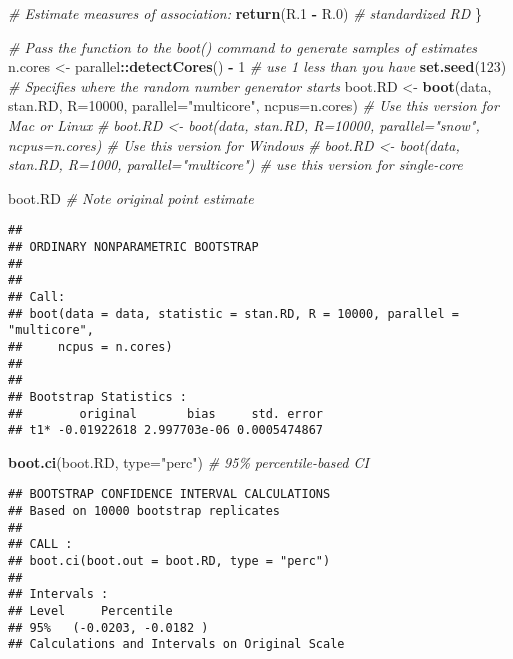 \documentclass[
]{article}
\newenvironment{Shaded}{\begin{snugshade}}{\end{snugshade}}
\newcommand{\AttributeTok}[1]{\textcolor[rgb]{0.13,0.29,0.53}{#1}}
\newcommand{\CommentTok}[1]{\textcolor[rgb]{0.56,0.35,0.01}{\textit{#1}}}
\newcommand{\DecValTok}[1]{\textcolor[rgb]{0.00,0.00,0.81}{#1}}
\newcommand{\FloatTok}[1]{\textcolor[rgb]{0.00,0.00,0.81}{#1}}
\newcommand{\FunctionTok}[1]{\textcolor[rgb]{0.13,0.29,0.53}{\textbf{#1}}}
\newcommand{\NormalTok}[1]{#1}
\newcommand{\OtherTok}[1]{\textcolor[rgb]{0.56,0.35,0.01}{#1}}
\newcommand{\SpecialCharTok}[1]{\textcolor[rgb]{0.81,0.36,0.00}{\textbf{#1}}}
\newcommand{\StringTok}[1]{\textcolor[rgb]{0.31,0.60,0.02}{#1}}
\begin{document}
\begin{Shaded}
\begin{Highlighting}[]
  \CommentTok{\# Estimate measures of association:}
  \FunctionTok{return}\NormalTok{(R}\FloatTok{.1} \SpecialCharTok{{-}}\NormalTok{ R}\FloatTok{.0}\NormalTok{) }\CommentTok{\# standardized RD}
\NormalTok{\}}

\CommentTok{\# Pass the function to the boot() command to generate samples of estimates}
\NormalTok{n.cores }\OtherTok{\textless{}{-}}\NormalTok{ parallel}\SpecialCharTok{::}\FunctionTok{detectCores}\NormalTok{() }\SpecialCharTok{{-}} \DecValTok{1} \CommentTok{\# use 1 less than you have}
\FunctionTok{set.seed}\NormalTok{(}\DecValTok{123}\NormalTok{) }\CommentTok{\# Specifies where the random number generator starts}
\NormalTok{boot.RD }\OtherTok{\textless{}{-}} \FunctionTok{boot}\NormalTok{(data, stan.RD, }\AttributeTok{R=}\DecValTok{10000}\NormalTok{, }\AttributeTok{parallel=}\StringTok{"multicore"}\NormalTok{, }\AttributeTok{ncpus=}\NormalTok{n.cores) }\CommentTok{\# Use this version for Mac or Linux}
\CommentTok{\# boot.RD \textless{}{-} boot(data, stan.RD, R=10000, parallel="snow", ncpus=n.cores) \# Use this version for Windows}
\CommentTok{\# boot.RD \textless{}{-} boot(data, stan.RD, R=1000, parallel="multicore") \# use this version for single{-}core}

\NormalTok{boot.RD }\CommentTok{\# Note original point estimate}
\end{Highlighting}
\end{Shaded}

\begin{verbatim}
## 
## ORDINARY NONPARAMETRIC BOOTSTRAP
## 
## 
## Call:
## boot(data = data, statistic = stan.RD, R = 10000, parallel = "multicore", 
##     ncpus = n.cores)
## 
## 
## Bootstrap Statistics :
##        original       bias     std. error
## t1* -0.01922618 2.997703e-06 0.0005474867
\end{verbatim}

\begin{Shaded}
\begin{Highlighting}[]
\FunctionTok{boot.ci}\NormalTok{(boot.RD, }\AttributeTok{type=}\StringTok{"perc"}\NormalTok{) }\CommentTok{\# 95\% percentile{-}based CI}
\end{Highlighting}
\end{Shaded}

\begin{verbatim}
## BOOTSTRAP CONFIDENCE INTERVAL CALCULATIONS
## Based on 10000 bootstrap replicates
## 
## CALL : 
## boot.ci(boot.out = boot.RD, type = "perc")
## 
## Intervals : 
## Level     Percentile     
## 95%   (-0.0203, -0.0182 )  
## Calculations and Intervals on Original Scale
\end{verbatim}
\end{document}
